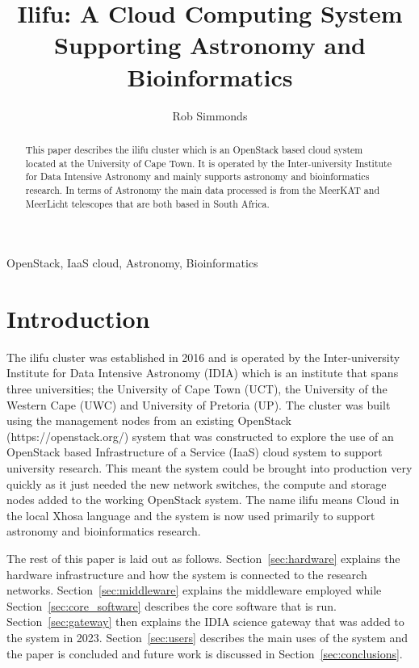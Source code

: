 \documentclass{iau_FM}
\title{Ilifu: A Cloud Computing System Supporting Astronomy and Bioinformatics}
\author{Rob Simmonds}
\affiliation{Inter-university Institute for Data Intensive Astronomy \\ South Africa}
\begin{document}
\maketitle

\begin{abstract}
This paper describes the {\sc ilifu} cluster which is an OpenStack based cloud system located at the University of Cape Town. 
It is operated by the Inter-university Institute for Data Intensive Astronomy and mainly supports 
astronomy and bioinformatics research. In terms of Astronomy the main data processed is from the MeerKAT and MeerLicht 
telescopes that are both based in South Africa.
 \end{abstract}
  OpenStack, IaaS cloud, Astronomy, Bioinformatics

\section{Introduction}
 
The {\sc ilifu} cluster was established in 2016 and 
is operated by the Inter-university Institute for Data Intensive Astronomy (IDIA) which is an
institute that spans three universities; the University of Cape Town (UCT), 
the University of the 
Western Cape (UWC) and University of Pretoria (UP).
The cluster was built using the management nodes from an 
existing OpenStack (https://openstack.org/) system that was constructed to explore the 
use of an OpenStack based Infrastructure of a Service (IaaS) cloud system to support university research. 
This meant the
system could be brought into production very quickly as it just needed the new
network switches, the compute and storage nodes added to the working OpenStack system.
The name ilifu means
Cloud in the local Xhosa language and the system is now used primarily to support
astronomy and bioinformatics research.

The rest of this paper is laid out as follows. Section~\ref{sec:hardware}
 explains the hardware infrastructure and how
the system is connected to the research networks. Section~\ref{sec:middleware} 
explains the middleware employed while
Section~\ref{sec:core_software} describes the core software that is run.
Section~\ref{sec:gateway} then explains the IDIA
science gateway that was added to the system in 2023. Section~\ref{sec:users}
describes the main uses of the system and 
the paper is concluded and future work is discussed in
Section~\ref{sec:conclusions}.
\end{document}
